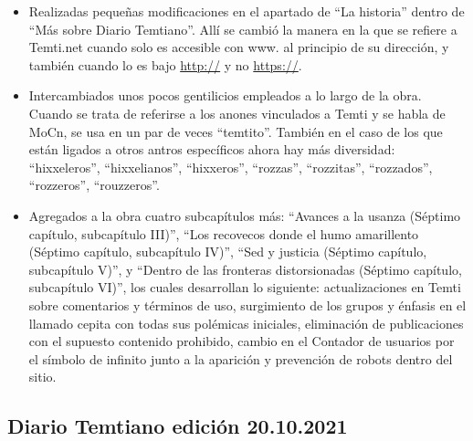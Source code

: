 \documentclass[
]{book}
\begin{document}
\begin{itemize}
\item
  Realizadas pequeñas modificaciones en el apartado de ``La historia'' dentro de ``Más sobre Diario Temtiano''. Allí se cambió la manera en la que se refiere a Temti.net cuando solo es accesible con www. al principio de su dirección, y también cuando lo es bajo \url{http://} y no \url{https://}.
\item
  Intercambiados unos pocos gentilicios empleados a lo largo de la obra. Cuando se trata de referirse a los anones vinculados a Temti y se habla de MoCn, se usa en un par de veces ``temtito''. También en el caso de los que están ligados a otros antros específicos ahora hay más diversidad: ``hixxeleros'', ``hixxelianos'', ``hixxeros'', ``rozzas'', ``rozzitas'', ``rozzados'', ``rozzeros'', ``rouzzeros''.
\item
  Agregados a la obra cuatro subcapítulos más: ``Avances a la usanza (Séptimo capítulo, subcapítulo III)'', ``Los recovecos donde el humo amarillento (Séptimo capítulo, subcapítulo IV)'', ``Sed y justicia (Séptimo capítulo, subcapítulo V)'', y ``Dentro de las fronteras distorsionadas (Séptimo capítulo, subcapítulo VI)'', los cuales desarrollan lo siguiente: actualizaciones en Temti sobre comentarios y términos de uso, surgimiento de los grupos y énfasis en el llamado cepita con todas sus polémicas iniciales, eliminación de publicaciones con el supuesto contenido prohibido, cambio en el Contador de usuarios por el símbolo de infinito junto a la aparición y prevención de robots dentro del sitio.
\end{itemize}

\hypertarget{diario-temtiano-ediciuxf3n-20.10.2021}{%
\subsection*{Diario Temtiano edición 20.10.2021}\label{diario-temtiano-ediciuxf3n-20.10.2021}}
\end{document}

